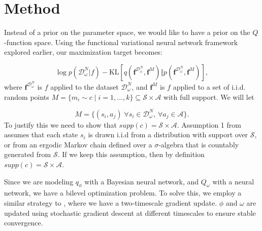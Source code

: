 \documentclass[]{uai2021} %
\newcommand{\R}{\mathbb{R}}
\newcommand{\D}{\mathcal{D}}
\newcommand{\f}{\mathbf{f}}
\newcommand{\state}{\mathcal{S}}
\newcommand{\action}{\mathcal{A}}
\newcommand{\KL}{\mathrm{KL}}
\begin{document}
\section{Method}
Instead of a prior on the parameter space, we would like to have a prior on the \(Q\)-function space.
Using the functional variational neural network framework explored earlier, our maximization target
becomes:

\begin{equation}
    \log p(\D_\omega^N \vert f) - \KL \left[ q(\f^{\D_\omega^N}, \f^M) \Vert p(\f^{\D_\omega^N}, \f^M) \right],
\end{equation}
where \(\f^{\D_\omega^N}\) is \(f\) applied to the dataset \(\D_\omega^N\), and \(\f^M\) is \(f\) applied to
a set of i.i.d. random points \(M = \{m_i \sim c \mid i=1,\dots,k\} \subseteq \state \times \action\)
with full support. We will let

\begin{equation}
    M = \{(s_i, a_j) \; \forall s_i \in \D_\omega^N,\, \forall a_j \in \action\}. 
\end{equation}
To justify this we need to show that \(supp(c) = \state \times \action\). Assumption 1 from
\citet{fellows_bayesian_2021} assumes that each state \(s_i\) is drawn i.i.d from a distribution with
support over \(\state\), or from an ergodic Markov chain defined over a \(\sigma\)-algebra that is
countably generated from \(\state\). If we keep this assumption, then by definition \(supp(c) = \state \times \action\).

Since we are modeling \(q_\phi\) with a Bayesian neural network, and \(Q_\omega\) with a neural network,
we have a bilevel optimization problem. To solve this, we employ a similar strategy to \cite{fellows_bayesian_2021},
where we have a two-timescale gradient update. \(\phi\) and \(\omega\) are updated using stochastic
gradient descent at different timescales to ensure stable convergence.

\end{document}
